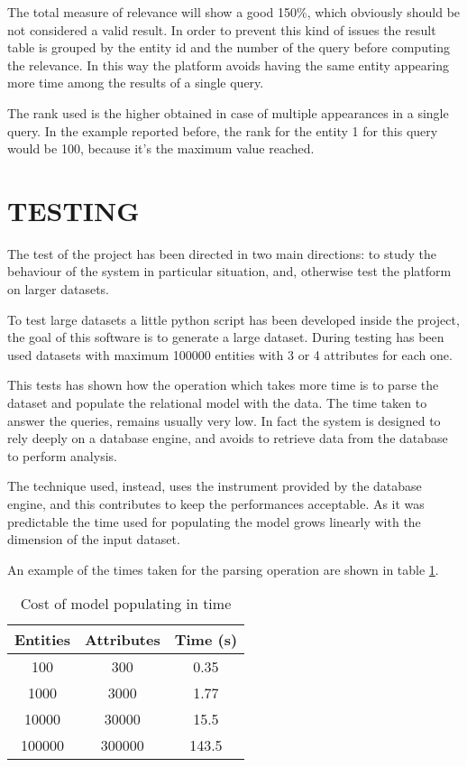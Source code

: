 \documentclass{acm_proc_article-sp-sigmod07}
\begin{document}
The total measure of relevance will show a good 150\%, which obviously
should be not considered a valid result.
In order to prevent this kind of issues the result table is grouped by the
entity id and the number of the query before computing the relevance.
In this way the platform avoids having the same entity appearing more time
among the results of a single query.

The rank used is the higher obtained in case of multiple appearances in a
single query.
In the example reported before, the rank for the entity 1 for this query
would be 100, because it's the maximum value reached.

\section{TESTING}
The test of the project has been directed in two main directions: to study
the behaviour of the system in particular situation, and, otherwise test
the platform on larger datasets.

To test large datasets a little python script has been developed inside
the project, the goal of this software is to generate a large dataset.
During testing has been used datasets with maximum 100000 entities with 3
or 4 attributes for each one.

This tests has shown how the operation which takes more time is to parse
the dataset and populate the relational model with the data. The time
taken to answer the queries, remains usually very low.
In fact the system is designed to rely deeply on a database engine, and
avoids to retrieve data from the database to perform analysis.

The technique used, instead, uses the instrument provided by the database
engine, and this contributes to keep the performances acceptable.
As it was predictable the time used for populating the model grows
linearly with the dimension of the input dataset.

An example of the times taken for the parsing operation are shown in table
\ref{tabtime}.

\begin{table}
\begin{tabular}{|c|c|c|}
\hline
Entities & Attributes & Time (s) \\
\hline
100 & 300 & 0.35 \\
1000 & 3000 & 1.77 \\
10000 & 30000 & 15.5 \\
100000 & 300000 & 143.5 \\
\hline
\end{tabular}
\caption{Cost of model populating in time}
\label{tabtime}
\end{table}
\end{document}
